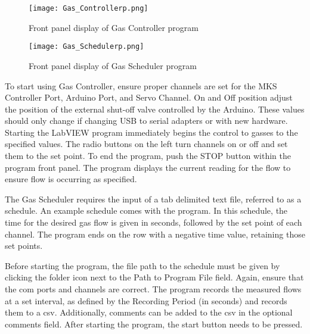         \begin{figure}
            \begin{center}
            \texttt{[image: Gas\_Controllerp.png]}
            \end{center}
            \caption{Front panel display of Gas Controller program}
            \label{fig:gascontrolfront}
        \end{figure}

        \begin{figure}
            \begin{center}
            \texttt{[image: Gas\_Schedulerp.png]}
            \end{center}
            \caption{Front panel display of Gas Scheduler program}
            \label{fig:gasschedfront}
        \end{figure}

        To start using Gas Controller, ensure proper channels are set for the MKS Controller Port, Arduino Port, and Servo Channel.
        On and Off position adjust the position of the external shut-off valve controlled by the Arduino.
        These values should only change if changing USB to serial adapters or with new hardware.
        Starting the LabVIEW program immediately begins the control to gasses to the specified values.
        The radio buttons on the left turn channels on or off and set them to the set point.
        To end the program, push the STOP button within the program front panel.
        The program displays the current reading for the flow to ensure flow is occurring as specified.

        The Gas Scheduler requires the input of a tab delimited text file, referred to as a schedule.
        An example schedule comes with the program.
        In this schedule, the time for the desired gas flow is given in seconds, followed by the set point of each channel.
        The program ends on the row with a negative time value, retaining those set points.

        Before starting the program, the file path to the schedule must be given by clicking the folder icon next to the Path to Program File field.
        Again, ensure that the com ports and channels are correct.
        The program records the measured flows at a set interval, as defined by the Recording Period (in seconds) and records them to a \gls{csv}.
        Additionally, comments can be added to the \gls{csv} in the optional comments field.
        After starting the program, the start button needs to be pressed.

